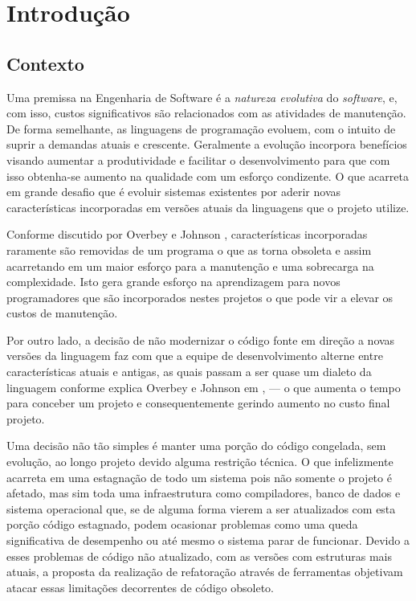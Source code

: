 \chapter{Introdução}



\section{Contexto}

Uma premissa na Engenharia de Software é a \emph{natureza evolutiva} do \textit{software}, e, com isso, custos significativos são relacionados com as atividades de manutenção. De forma semelhante, as linguagens de programação evoluem, com o intuito de suprir a demandas atuais e crescente. Geralmente a evolução incorpora benefícios visando aumentar a produtividade e facilitar o desenvolvimento para que com isso obtenha-se aumento na qualidade com um esforço condizente. O que acarreta em grande desafio que é evoluir sistemas existentes por aderir novas características incorporadas em versões atuais da linguagens \cite{Dyer:2013} que o projeto utilize.

Conforme discutido por Overbey e Johnson \cite{Overbey:2009}, características incorporadas raramente são removidas de um programa o que as torna obsoleta e assim acarretando em um maior esforço para a manutenção e uma  sobrecarga na complexidade. Isto gera grande esforço na aprendizagem para novos programadores  que são incorporados nestes projetos o que pode vir a elevar os custos de manutenção. 

Por outro lado, a decisão de não modernizar o código fonte em direção a novas versões da linguagem faz com que a equipe de desenvolvimento alterne entre características atuais e antigas, as quais passam a ser quase um dialeto da linguagem conforme explica Overbey e Johnson em \cite{Overbey:2009}, --- o que aumenta o tempo para conceber um projeto e consequentemente gerindo aumento no custo final projeto.

Uma decisão não tão simples é manter uma porção do código congelada, sem evolução, ao longo projeto devido alguma restrição técnica. O que infelizmente acarreta em uma estagnação de todo um sistema pois não somente o projeto é afetado, mas sim toda uma infraestrutura como compiladores, banco de dados e sistema operacional que, se de alguma forma vierem a ser atualizados com esta porção código estagnado, podem ocasionar problemas como uma queda significativa de desempenho ou até mesmo o sistema parar de funcionar. Devido a esses problemas de código não atualizado, com as versões com estruturas mais atuais, a proposta da realização de refatoração através de ferramentas objetivam atacar essas limitações decorrentes de código obsoleto.

